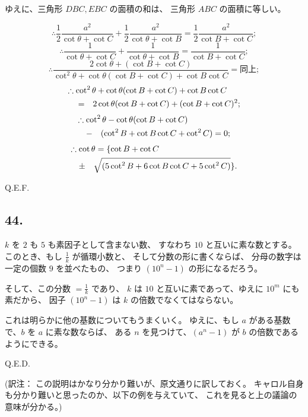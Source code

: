 ゆえに、三角形 $DBC, EBC$ の面積の和は、
三角形 $ABC$ の面積に等しい。

\[
\therefore
\frac{1}{2} \frac{a^2}{\cot \theta + \cot C}
+ \frac{1}{2} \frac{a^2}{\cot \theta + \cot B}
= \frac{1}{2} \frac{a^2}{\cot B + \cot C};
\]
\[
\therefore
\frac{1}{\cot \theta + \cot C}
+ \frac{1}{\cot \theta + \cot B}
= \frac{1}{\cot B + \cot C};
\]
\[
\therefore
\frac{2 \cot \theta + (\cot B + \cot C)}
{\cot^2 \theta + \cot \theta(\cot B + \cot C) + \cot B \cot C}
= \mbox{同上};
\]
\begin{eqnarray*}
\therefore
\lefteqn{\cot^2 \theta + \cot \theta (\cot B + \cot C) + \cot B \cot C}\\
 &=&
 2 \cot \theta ( \cot B + \cot C) + (\cot B + \cot C)^2;
\end{eqnarray*}
\begin{eqnarray*}
\therefore
\lefteqn{\cot^2 \theta - \cot \theta (\cot B + \cot C)}\\
 &-&
 ( \cot^2 B + \cot B \cot C+ \cot^2 C ) = 0;
\end{eqnarray*}
\begin{eqnarray*}
\therefore
\lefteqn{\cot \theta = \{ \cot B + \cot C}\\
 &\pm&
 \sqrt{ ( 5 \cot^2 B + 6 \cot B \cot C+ 5 \cot^2 C )} \}.
\end{eqnarray*}

Q.E.F.


\subsection*{44.}

$k$ を $2$ も $5$ も素因子として含まない数、
すなわち $10$ と互いに素な数とする。
このとき、もし $\frac{1}{k}$ が循環小数と、
そして分数の形に書くならば、
分母の数字は一定の個数 $9$ を並べたもの、
つまり $(10^n - 1)$ の形になるだろう。

そして、この分数 $= \frac{1}{k}$ であり、
 $k$ は $10$ と互いに素であって、ゆえに $10^m$ にも素だから、
因子 $(10^n - 1)$ は $k$ の倍数でなくてはならない。

これは明らかに他の基数についてもうまくいく。
ゆえに、もし $a$ がある基数で、$b$ を $a$ に素な数ならば、
ある $n$ を見つけて、$(a^n - 1)$ が $b$ の倍数であるようにできる。

Q.E.D.

(訳注： この説明はかなり分かり難いが、原文通りに訳しておく。
キャロル自身も分かり難いと思ったのか、以下の例を与えていて、
これを見ると上の議論の意味が分かる。)


